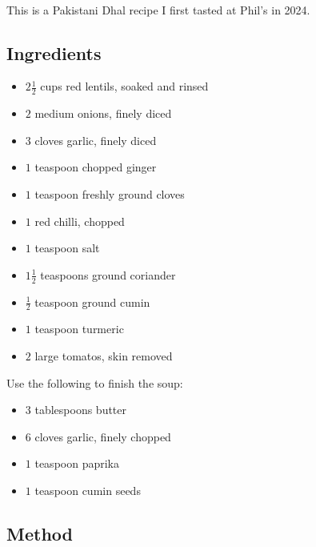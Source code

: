 \documentclass[11pt,a4paper]{article}
\begin{document}
\paragraph*{}
This is a Pakistani Dhal recipe I first tasted at Phil's in 2024.


\subsection*{Ingredients}

\begin{multicols}{2}

\begin{itemize}
  \item $ 2 \frac{1}{2} $ cups red lentils, soaked and rinsed
  \item $ 2 $ medium onions, finely diced
  \item $ 3 $ cloves garlic, finely diced
  \item $ 1 $ teaspoon chopped ginger
  \item $ 1 $ teaspoon freshly ground cloves
  \item $ 1 $ red chilli, chopped
  \item $ 1 $ teaspoon salt
  \item $ 1 \frac{1}{2} $ teaspoons ground coriander
  \item $ \frac{1}{2} $ teaspoon ground cumin
  \item $ 1 $ teaspoon turmeric
  \item $ 2 $ large tomatos, skin removed
\end{itemize}

\columnbreak

Use the following to finish the soup:

\begin{itemize}
  \item $ 3 $ tablespoons butter
  \item $ 6 $ cloves garlic, finely chopped
  \item $ 1 $ teaspoon paprika
  \item $ 1 $ teaspoon cumin seeds
\end{itemize}

\end{multicols}

\medskip

\subsection*{Method}
\end{document}

